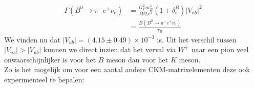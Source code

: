 \documentclass[../main.tex]{subfiles}
\begin{document}
\begin{equation}
    \begin{aligned}
        \label{eq:b_zwak_verval}
        \Gamma\left(B^{0} \rightarrow \pi^{-} e^{+} \nu_{e}\right) &=\frac{G_{F}^{2} m_{B}^{5}}{192 \pi^{3}}\left(1+\delta_{e}^{B}\right)\left|V_{u b}\right|^{2} \\
                                                                   &=\frac{B\left(B^{0} \rightarrow \pi^{-} e^{+} \nu_{e}\right)}{\tau_{B}}
    \end{aligned}
\end{equation}
We vinden nu dat $\left|V_{u b}\right|=(4.15 \pm 0.49) \times 10^{-3}$ is.\newpage
Uit het verschil tussen $\left|V_{us}\right| > \left|V_{u b}\right|$ kunnen we direct inzien dat het verval via $W^+$ naar een pion veel onwaarschijnlijker is voor het $B$ meson dan voor het $K$ meson.\\
Zo is het mogelijk om voor een aantal andere CKM-matrixelementen deze ook experimenteel te bepalen:
\end{document}
